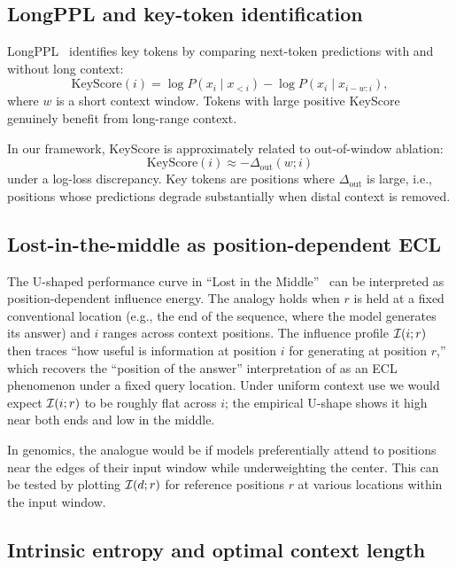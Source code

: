 \subsection{LongPPL and key-token identification}

LongPPL~\citep{Fang2024LongPPL} identifies key tokens by comparing next-token predictions with and without long context:
\[
\mathrm{KeyScore}(i) = \log P(x_i \mid x_{<i}) - \log P(x_i \mid x_{i-w:i}),
\]
where $w$ is a short context window. Tokens with large positive KeyScore genuinely benefit from long-range context.

In our framework, KeyScore is approximately related to out-of-window ablation:
\[
\mathrm{KeyScore}(i) \approx -\Delta_{\mathrm{out}}(w; i)
\]
under a log-loss discrepancy. Key tokens are positions where $\Delta_{\mathrm{out}}$ is large, i.e., positions whose predictions degrade substantially when distal context is removed.

\subsection{Lost-in-the-middle as position-dependent ECL}

The U-shaped performance curve in ``Lost in the Middle''~\citep{Liu2024LostInMiddle} can be interpreted as position-dependent influence energy. The analogy holds when $r$ is held at a fixed conventional location (e.g., the end of the sequence, where the model generates its answer) and $i$ ranges across context positions. The influence profile $\mathcal{I}(i;r)$ then traces ``how useful is information at position $i$ for generating at position $r$,'' which recovers the ``position of the answer'' interpretation of \citet{Liu2024LostInMiddle} as an ECL phenomenon under a fixed query location. Under uniform context use we would expect $\mathcal{I}(i;r)$ to be roughly flat across $i$; the empirical U-shape shows it high near both ends and low in the middle.

In genomics, the analogue would be if models preferentially attend to positions near the edges of their input window while underweighting the center. This can be tested by plotting $\mathcal{I}(d;r)$ for reference positions $r$ at various locations within the input window.

\subsection{Intrinsic entropy and optimal context length}

